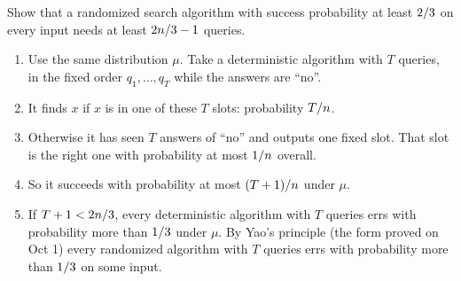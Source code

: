 \begin{exercisebox}
\begin{pproblem}\label{pp:yao-mc}
    Show that a randomized search algorithm with success probability at least $2/3$ on
    every input needs at least $2n/3 - 1$ queries.
\end{pproblem}
\tcblower
\begin{wsolution}
    \leavevmode
    \begin{enumerate}
        \item Use the same distribution $\mu$. Take a deterministic algorithm with $T$ queries, in
              the fixed order $q_1, \dots, q_T$ while the answers are ``no''.
        \item It finds $x$ if $x$ is in one of these $T$ slots: probability $T/n$.
        \item Otherwise it has seen $T$ answers of ``no'' and outputs one fixed slot. That slot is
              the right one with probability at most $1/n$ overall.
        \item So it succeeds with probability at most $(T+1)/n$ under $\mu$.
        \item If $T + 1 < 2n/3$, every deterministic algorithm with $T$ queries errs with
              probability more than $1/3$ under $\mu$. By Yao's principle (the form proved
              on Oct 1) every randomized algorithm with $T$ queries errs with probability more than
              $1/3$ on some input. \qedhere
    \end{enumerate}
\end{wsolution}
\end{exercisebox}

